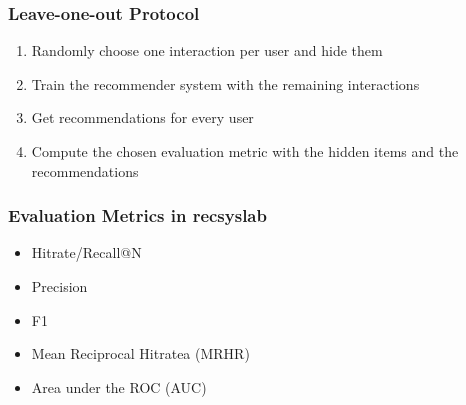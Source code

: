 \documentclass[mathserif,svgnames]{beamer}
\newcommand\marktopleft[1]{%
    \tikz[overlay,remember picture] 
    \node (marker-#1-a) at (0,1.5ex) {};%
}
\newcommand\markbottomright[2][red]{%
    \tikz[overlay,remember picture] 
    \node (marker-#2-b) at (0,0) {};%
    \tikz[overlay,remember picture,thick,inner sep=3pt,fill=red]
    \node[draw,rectangle,fill=#1,nearly transparent,fit=(marker-#2-a.center) (marker-#2-b.center)] {};%
}
\begin{document}
%

\begin{frame}
    \frametitle{Leave-one-out Protocol~\cite{leaveoneout}}\pause
    \begin{enumerate}
        \item Randomly choose one interaction per user and hide them\pause
        \item Train the recommender system with the remaining interactions\pause
        \item Get recommendations for every user\pause
        \item Compute the chosen evaluation metric with the hidden items and the recommendations
    \end{enumerate}

\end{frame}
\begin{frame}
    \frametitle{Evaluation Metrics in recsyslab}
    \begin{itemize}
        \item Hitrate/Recall@N~\cite{Karypis:2001:EIT:502585.502627, Sarwar00applicationof}
        \item Precision~\cite{Sarwar00applicationof}
        \item F1~\cite{Sarwar00applicationof}
        \item Mean Reciprocal Hitratea (MRHR)~\cite{DBLP:conf/icdm/NingK11}
        \item Area under the ROC (AUC)~\cite{Rendle:2009:BBP:1795114.1795167}
    \end{itemize}
\end{frame}
\end{document}
